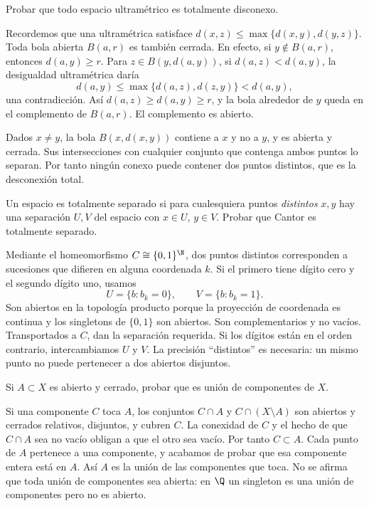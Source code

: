 \begin{ejercicio}
Probar que todo espacio ultramétrico es totalmente disconexo.
\end{ejercicio}
\begin{solucion}
Recordemos que una ultramétrica satisface $d(x,z)\le\max\{d(x,y),d(y,z)\}$. Toda bola abierta $B(a,r)$ es también cerrada. En efecto, si $y\notin B(a,r)$, entonces $d(a,y)\ge r$. Para $z\in B(y,d(a,y))$, si $d(a,z)<d(a,y)$, la desigualdad ultramétrica daría
\[
d(a,y)\le\max\{d(a,z),d(z,y)\}<d(a,y),
\]
una contradicción. Así $d(a,z)\ge d(a,y)\ge r$, y la bola alrededor de $y$ queda en el complemento de $B(a,r)$. El complemento es abierto.

Dados $x\ne y$, la bola $B(x,d(x,y))$ contiene a $x$ y no a $y$, y es abierta y cerrada. Sus intersecciones con cualquier conjunto que contenga ambos puntos lo separan. Por tanto ningún conexo puede contener dos puntos distintos, que es la desconexión total.
\end{solucion}

\begin{ejercicio}
Un espacio es totalmente separado si para cualesquiera puntos \emph{distintos} $x,y$ hay una separación $U,V$ del espacio con $x\in U$, $y\in V$. Probar que Cantor es totalmente separado.
\end{ejercicio}
\begin{solucion}
Mediante el homeomorfismo $C\cong\{0,1\}^{\N}$, dos puntos distintos corresponden a sucesiones que difieren en alguna coordenada $k$. Si el primero tiene dígito cero y el segundo dígito uno, usamos
\[
U=\{b:b_k=0\},\qquad V=\{b:b_k=1\}.
\]
Son abiertos en la topología producto porque la proyección de coordenada es continua y los singletons de $\{0,1\}$ son abiertos. Son complementarios y no vacíos. Transportados a $C$, dan la separación requerida. Si los dígitos están en el orden contrario, intercambiamos $U$ y $V$. La precisión ``distintos'' es necesaria: un mismo punto no puede pertenecer a dos abiertos disjuntos.
\end{solucion}

\begin{ejercicio}
Si $A\subset X$ es abierto y cerrado, probar que es unión de componentes de $X$.
\end{ejercicio}
\begin{solucion}
Si una componente $C$ toca $A$, los conjuntos $C\cap A$ y $C\cap(X\setminus A)$ son abiertos y cerrados relativos, disjuntos, y cubren $C$. La conexidad de $C$ y el hecho de que $C\cap A$ sea no vacío obligan a que el otro sea vacío. Por tanto $C\subset A$. Cada punto de $A$ pertenece a una componente, y acabamos de probar que esa componente entera está en $A$. Así $A$ es la unión de las componentes que toca. No se afirma que toda unión de componentes sea abierta: en $\Q$ un singleton es una unión de componentes pero no es abierto.
\end{solucion}

